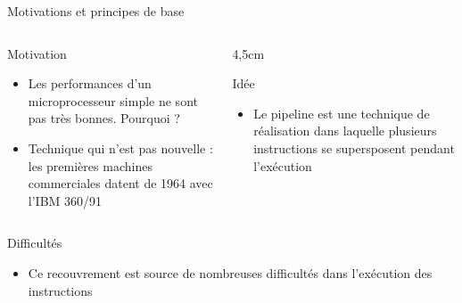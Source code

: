 %
\begin{Frame}{Motivations et principes de base}
  \begin{columns}[t]
    \begin{column}{7cm} %
      \begin{block}{Motivation}
        \begin{itemize}
        \item Les performances d'un microprocesseur simple ne sont pas
          très bonnes. Pourquoi ?
        \item Technique qui n'est pas nouvelle : les premières
          machines commerciales datent de 1964 avec l'IBM 360/91
        \end{itemize}
      \end{block} 
    \end{column}
    
    \begin{column}{4,5cm} %
      \begin{block}{Idée}
        \begin{itemize}
        \item Le pipeline est une technique de réalisation dans
          laquelle plusieurs instructions se supersposent pendant
          l'exécution
        \end{itemize}
      \end{block}   
    \end{column}
  \end{columns}  

  \begin{block}{Difficultés}
       \begin{center}
 	\begin{itemize}
    \item Ce recouvrement est source de nombreuses difficultés dans
      l'exécution des instructions
        \end{itemize}
       \end{center}
      \end{block}   

\end{Frame}


